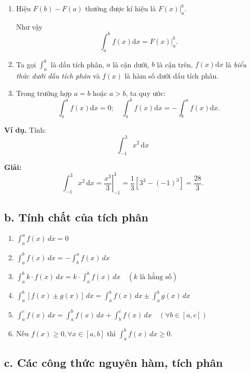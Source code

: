 \documentclass{article}
\begin{document}
\begin{enumerate}
    \item[1)] Hiệu $F(b) - F(a)$ thường được kí hiệu là $\left. F(x) \right|_a^b$.
    
    Như vậy
    \[
    \int_a^b f(x)\mathrm{d}x = \left. F(x) \right|_a^b.
    \]

    \item[2)] Ta gọi $\displaystyle\int_a^b$ là dấu tích phân, $a$ là cận dưới, $b$ là cận trên, $f(x)\mathrm{d}x$ là \textit{biểu thức dưới dấu tích phân} và $f(x)$ là hàm số dưới dấu tích phân.

    \item[3)] Trong trường hợp $a = b$ hoặc $a > b$, ta quy ước:
    \[
    \int_a^a f(x)\mathrm{d}x = 0; \quad \int_a^b f(x)\mathrm{d}x = -\int_b^a f(x)\mathrm{d}x.
    \]
\end{enumerate}

\noindent\textbf{Ví dụ.} Tính:
\[
\int_{-1}^{3} x^2 \, \mathrm{d}x
\]

\noindent\textbf{Giải:}
\[
\int_{-1}^{3} x^2 \, \mathrm{d}x = \left. \frac{x^3}{3} \right|_{-1}^{3} = \frac{1}{3} \left[ 3^3 - (-1)^3 \right] = \frac{28}{3}.
\]

\subsection*{b. Tính chất của tích phân}

\begin{enumerate}
    \item $\int_{a}^{a} f(x) \, dx = 0$
    \item $\int_{a}^{b} f(x) \, dx = -\int_{b}^{a} f(x) \, dx$
    \item $\int_{a}^{b} k \cdot f(x) \, dx = k \cdot \int_{a}^{b} f(x) \, dx \quad (k \text{ là hằng số})$
    \item $\int_{a}^{b} [f(x) \pm g(x)] \, dx = \int_{a}^{b} f(x) \, dx \pm \int_{a}^{b} g(x) \, dx$
    \item $\int_{a}^{c} f(x) \, dx = \int_{a}^{b} f(x) \, dx + \int_{b}^{c} f(x) \, dx \quad (\forall b \in [a, c])$
    \item Nếu $f(x) \ge 0, \forall x \in [a, b]$ thì $\int_{a}^{b} f(x) \, dx \ge 0$.
\end{enumerate}

\subsection*{c. Các công thức nguyên hàm, tích phân}
\end{document}
